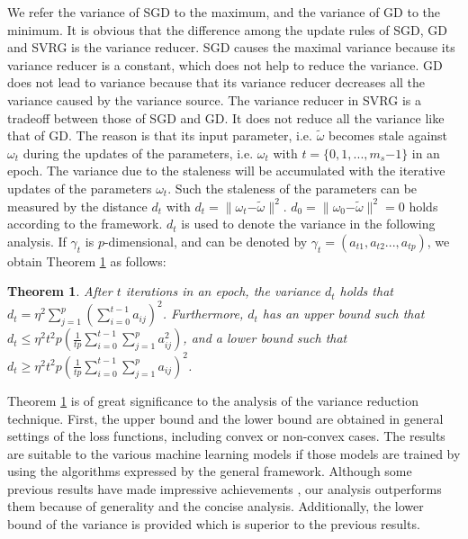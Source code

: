 \documentclass[letterpaper]{article}
\begin{document}
We refer the variance of SGD to the maximum, and  the variance of GD to the minimum.  It is obvious that the difference among the update rules of SGD, GD and SVRG is the variance reducer. SGD causes the maximal variance because its variance reducer is a constant, which does not help to reduce the variance. GD does not lead to variance because that its variance reducer decreases all the variance caused by the variance source. The variance reducer in SVRG is a tradeoff  between those of SGD and GD. It does not reduce all the variance like that of GD.  The reason is that its input parameter, i.e. $\tilde{\omega}$ becomes stale against $\omega_{t}$ during the updates of the parameters, i.e. $\omega_t$ with $t\mathrm{=}\{0,1, ..., m_s\mathrm{-}1\}$ in an epoch. The variance due to the staleness will be accumulated with the iterative updates of the parameters $\omega_{t}$.   Such the staleness of the parameters can be measured by  the distance $d_t$ with $d_t = \parallel \omega_{t} \mathrm{-} \tilde{\omega} \parallel^2$. $d_0 = \parallel \omega_{0}\mathrm{-}\tilde{\omega}\parallel^2 = 0$ holds according to the framework. $d_t$ is used to denote the variance in the following analysis.  If $\gamma_t$ is $p$-dimensional, and can be denoted by  $\gamma_t = (a_{t1}, a_{t2}..., a_{tp})$, we obtain Theorem \ref{theorem_vr_lower_bound}  as follows:


\newtheorem{Theorem}{\bf{Theorem}}
\newtheorem{Corollary}{\bf{Corollary}}
\newtheorem{Lemma}{\bf{Lemma}}
\newtheorem{Assumption}{\bf{Assumption}}


\begin{Theorem}
\label{theorem_vr_lower_bound}
   After $t$ iterations in an epoch, the variance $d_t$ holds that $d_t \mathrm{=} \eta^2 \sum\limits_{j=1}^p\left(  \sum\limits_{i=0}^{t-1} a_{ij}  \right)^2$. Furthermore, $d_t$ has an upper bound such that 
   $d_t \mathrm{\le} \eta^2 t^2p  \left( \frac{1}{tp}\sum\limits_{i=0}^{t-1}   \sum\limits_{j=1}^p   a_{ij}^2 \right)$, and a lower bound such that $d_t  \mathrm{\ge} \eta^2t^2p \left(\frac{1}{tp}\sum\limits_{i=0}^{t-1}   \sum\limits_{j=1}^p   a_{ij}\right)^2$.
\end{Theorem}

Theorem \ref{theorem_vr_lower_bound} is of great significance to the analysis of the variance reduction technique.
First, the upper bound and the lower bound are obtained in general settings of the loss functions, including convex or non-convex cases. The results are suitable to the various machine learning models if those models are trained by using the algorithms expressed by the general framework. Although some previous results  have made  impressive achievements \citep{ShalevShwartz:2016vy, Garber:2015td, AllenZhu:2016up}, our analysis outperforms them because of generality and the concise analysis. Additionally, the lower bound of the variance is provided which is superior to the previous results.
\end{document}
